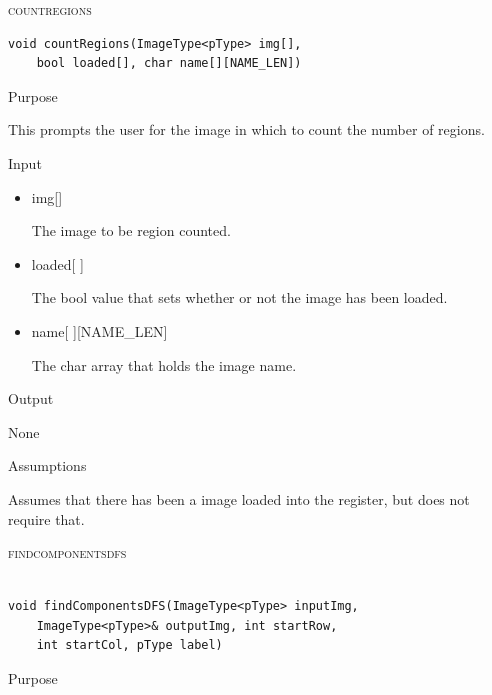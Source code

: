 \documentclass[pdftex, 11pt]{article}
\begin{document}
\begin{description}

	\item{\textsc{countregions}}

		\begin{lstlisting}
void countRegions(ImageType<pType> img[], 
	bool loaded[], char name[][NAME_LEN])
		\end{lstlisting}

		\begin{description}
			\item{Purpose}
				
				This prompts the user for the image in which to
				count the number of regions.

			\item{Input}
				
				\begin{itemize}

					\item{img[]}

						The image to be region counted.

					\item{loaded[ ]}

						The bool value that sets whether
						or not the image has been
						loaded.

					\item{name[ ][NAME\_LEN]}

						The char array that holds the
						image name.

				\end{itemize}

			\item{Output}
				
				None

			\item{Assumptions}

				Assumes that there has been a image loaded into
				the register, but does not require that. 


		\end{description}

	\item{\textsc{findcomponentsdfs}}

		\begin{lstlisting}

void findComponentsDFS(ImageType<pType> inputImg, 
	ImageType<pType>& outputImg, int startRow,
	int startCol, pType label)
		\end{lstlisting}

		\begin{description}
			\item{Purpose}


\end{description}
\end{description}
\end{document}
